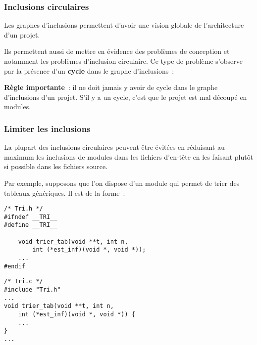 \begin{frame}[fragile]
\frametitle{Inclusions circulaires}
Les graphes d'inclusions permettent d'avoir une vision globale de
l'architecture d'un projet.
\bigskip

Ils permettent aussi de mettre en évidence des problèmes de conception
et notamment les problèmes d'\alert{inclusion circulaire}. Ce type de
problème s'observe par la présence d'un {\bf cycle} dans le graphe
d'inclusions~:
\begin{center}
\end{center}
\medskip

{\bf Règle importante}~: il ne doit jamais y avoir de cycle dans le
graphe d'inclusions d'un projet. S'il y a un cycle, c'est que le projet
est mal découpé en modules.
\end{frame}

\begin{frame}[fragile]
\frametitle{Limiter les inclusions}
La plupart des inclusions circulaires peuvent être évitées en
\alert{réduisant au maximum les inclusions} de modules dans les
\alert{fichiers d'en-tête} en les faisant plutôt si possible dans les
fichiers source.
\bigskip
\bigskip
\bigskip

Par exemple, supposons que l'on dispose d'un module  qui
permet de trier des tableaux génériques. Il est de la forme~:
\medskip

\begin{minipage}[c]{.45\textwidth}
\begin{lstlisting}[frame=single,numbers=none,basicstyle=\ttfamily\scriptsize]
/* Tri.h */
#ifndef __TRI__
#define __TRI__

    void trier_tab(void **t, int n,
        int (*est_inf)(void *, void *));
    ...
#endif
\end{lstlisting}
\end{minipage}
\quad
\begin{minipage}[c]{.45\textwidth}
\begin{lstlisting}[frame=single,numbers=none,basicstyle=\ttfamily\scriptsize]
/* Tri.c */
#include "Tri.h"
...
void trier_tab(void **t, int n,
    int (*est_inf)(void *, void *)) {
    ...
}
...
\end{lstlisting}
\end{minipage}
\end{frame}

